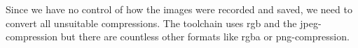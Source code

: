 \documentclass[../ImageClassifier.tex]{subfiles}
\begin{document}
    Since we have no control of how the images were recorded and saved, we need to convert all unsuitable compressions.
    The toolchain uses \ac{rgb} and the \ac{jpeg}-compression but there are countless other formats like \ac{rgba} or \ac{png}-compression.
\end{document}
